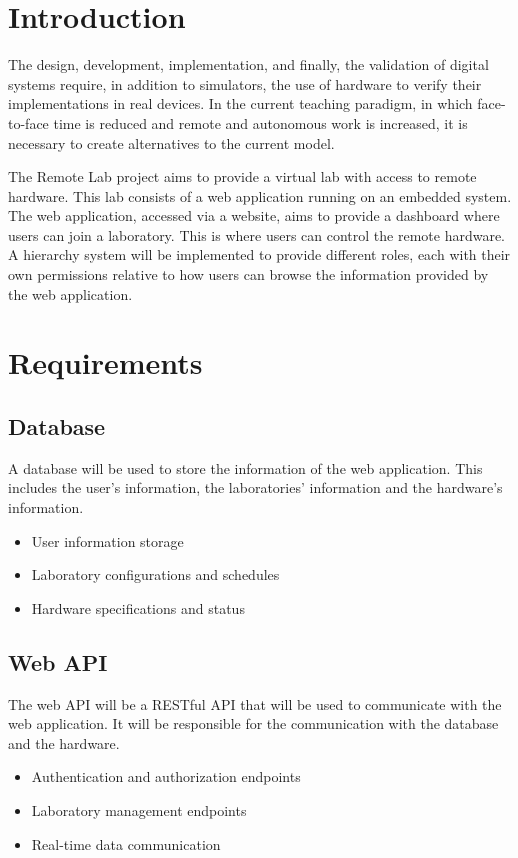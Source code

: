 \documentclass[a4paper,twoside,11pt]{article}
\begin{document}
\section*{Introduction}
The design, development, implementation, and finally, the validation of digital systems require, in addition to simulators, the use of hardware to verify their implementations in real devices. In the current teaching paradigm, in which face-to-face time is reduced and remote and autonomous work is increased, it is necessary to create alternatives to the current model.

The Remote Lab project aims to provide a virtual lab with access to remote hardware. This lab consists of a web application running on an embedded system.
The web application, accessed via a website, aims to provide a dashboard where users can join a laboratory. This is where users can control the remote hardware.
A hierarchy system will be implemented to provide different roles, each with their own permissions relative to how users can browse the information provided by the web application.

\section*{Requirements}
\subsection*{Database}
A database will be used to store the information of the web application.
This includes the user's information, the laboratories' information and the hardware's information.
\begin{itemize}
    \item User information storage
    \item Laboratory configurations and schedules
    \item Hardware specifications and status
\end{itemize}

\subsection*{Web API}
The web API will be a RESTful API that will be used to communicate with the web application.
It will be responsible for the communication with the database and the hardware.
\begin{itemize}
    \item Authentication and authorization endpoints
    \item Laboratory management endpoints
    \item Real-time data communication
\end{itemize}
\end{document}
